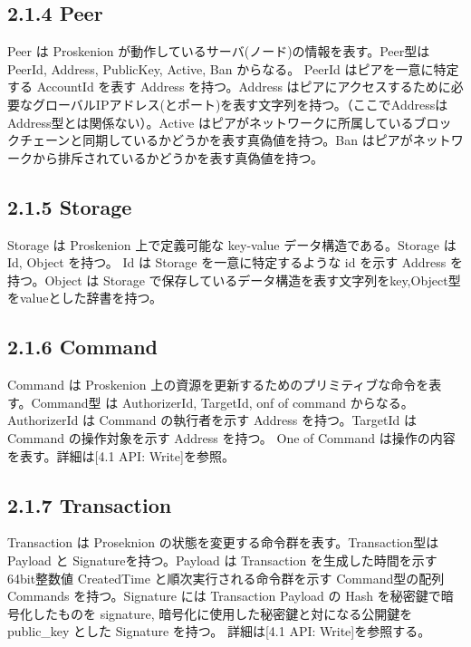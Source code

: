 \hypertarget{peer}{%
\subsection{2.1.4 Peer}\label{peer}}

Peer は Proskenion が動作しているサーバ(ノード)の情報を表す。Peer型は
PeerId, Address, PublicKey, Active, Ban からなる。 PeerId
はピアを一意に特定する AccountId を表す Address を持つ。Address
はピアにアクセスするために必要なグローバルIPアドレス(とポート)を表す文字列を持つ。（ここでAddressはAddress型とは関係ない）。Active
はピアがネットワークに所属しているブロックチェーンと同期しているかどうかを表す真偽値を持つ。Ban
はピアがネットワークから排斥されているかどうかを表す真偽値を持つ。

\hypertarget{storage}{%
\subsection{2.1.5 Storage}\label{storage}}

Storage は Proskenion 上で定義可能な key-value データ構造である。Storage
は Id, Object を持つ。 Id は Storage を一意に特定するような id を示す
Address を持つ。Object は Storage
で保存しているデータ構造を表す文字列をkey,Object型をvalueとした辞書を持つ。

\hypertarget{command}{%
\subsection{2.1.6 Command}\label{command}}

Command は Proskenion
上の資源を更新するためのプリミティブな命令を表す。Command型 は
AuthorizerId, TargetId, onf of command からなる。AuthorizerId は Command
の執行者を示す Address を持つ。TargetId は Command の操作対象を示す
Address を持つ。 One of Command は操作の内容を表す。詳細は{[}4.1 API:
Write{]}を参照。

\hypertarget{transaction}{%
\subsection{2.1.7 Transaction}\label{transaction}}

Transaction は Proseknion の状態を変更する命令群を表す。Transaction型は
Payload と Signatureを持つ。Payload は Transaction
を生成した時間を示す64bit整数値 CreatedTime と順次実行される命令群を示す
Command型の配列 Commands を持つ。Signature には Transaction Payload の
Hash を秘密鍵で暗号化したものを signature,
暗号化に使用した秘密鍵と対になる公開鍵を public\_key とした Signature
を持つ。 詳細は{[}4.1 API: Write{]}を参照する。

